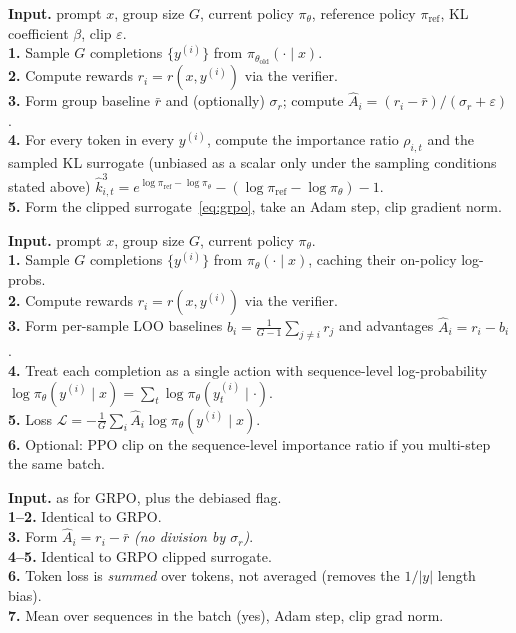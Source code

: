 \documentclass[11pt,oneside]{scrbook}
\begin{document}
\begin{tcolorbox}[colback=rlbg,colframe=rlblue,title={Algorithm: GRPO step (DeepSeekMath, 2024)}]
\textbf{Input.} prompt $x$, group size $G$, current policy $\pi_\theta$,
reference policy $\pi_\text{ref}$, KL coefficient $\beta$, clip $\varepsilon$.\\[2pt]
\textbf{1.} Sample $G$ completions $\{y^{(i)}\}$ from $\pi_{\theta_\text{old}}(\cdot \mid x)$.\\
\textbf{2.} Compute rewards $r_i = r(x, y^{(i)})$ via the verifier.\\
\textbf{3.} Form group baseline $\bar r$ and (optionally) $\sigma_r$;
   compute $\hat A_i = (r_i - \bar r)/(\sigma_r + \varepsilon)$.\\
\textbf{4.} For every token in every $y^{(i)}$, compute the importance ratio
   $\rho_{i,t}$ and the sampled KL surrogate (unbiased as a scalar only under the sampling conditions stated above)
   $\hat k^3_{i,t} = e^{\log\pi_\text{ref} - \log\pi_\theta} - (\log\pi_\text{ref} - \log\pi_\theta) - 1$.\\
\textbf{5.} Form the clipped surrogate~\eqref{eq:grpo}, take an Adam step,
   clip gradient norm.
\end{tcolorbox}

\begin{tcolorbox}[colback=rlbg,colframe=rlblue,title={Algorithm: RLOO step (Ahmadian et al., 2024)}]
\textbf{Input.} prompt $x$, group size $G$, current policy $\pi_\theta$.\\[2pt]
\textbf{1.} Sample $G$ completions $\{y^{(i)}\}$ from $\pi_\theta(\cdot \mid x)$,
caching their on-policy log-probs.\\
\textbf{2.} Compute rewards $r_i = r(x, y^{(i)})$ via the verifier.\\
\textbf{3.} Form per-sample LOO baselines
$b_i = \frac{1}{G-1}\sum_{j \ne i} r_j$ and advantages $\hat A_i = r_i - b_i$.\\
\textbf{4.} Treat each completion as a single action with sequence-level
log-probability $\log \pi_\theta(y^{(i)} \mid x) = \sum_t \log \pi_\theta(y_t^{(i)} \mid \cdot)$.\\
\textbf{5.} Loss $\mathcal{L} = - \tfrac{1}{G}\sum_i \hat A_i \log \pi_\theta(y^{(i)} \mid x)$.\\
\textbf{6.} Optional: PPO clip on the sequence-level importance ratio if you
multi-step the same batch.
\end{tcolorbox}

\begin{tcolorbox}[colback=rlbg,colframe=rlblue,title={Algorithm: Dr.GRPO step (Liu et al., 2025)}]
\textbf{Input.} as for GRPO, plus the debiased flag.\\[2pt]
\textbf{1--2.} Identical to GRPO.\\
\textbf{3.} Form $\hat A_i = r_i - \bar r$ \emph{(no division by $\sigma_r$)}.\\
\textbf{4--5.} Identical to GRPO clipped surrogate.\\
\textbf{6.} Token loss is \emph{summed} over tokens, not averaged
(removes the $1/|y|$ length bias).\\
\textbf{7.} Mean over sequences in the batch (yes), Adam step, clip grad norm.
\end{tcolorbox}
\end{document}
